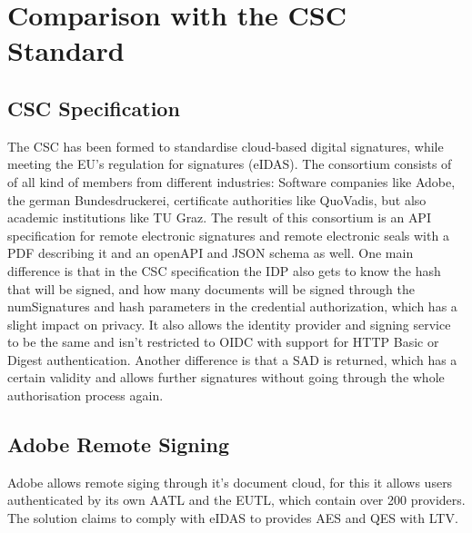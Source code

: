 \chapter{Comparison with the CSC Standard}

\section{CSC Specification}

The \gls{CSC} has been formed to standardise cloud-based digital signatures, while meeting the \gls{EU}'s regulation for signatures (\gls{eIDAS}).
The consortium consists of of all kind of members from different industries: Software companies like Adobe, the german Bundesdruckerei, certificate authorities like QuoVadis, but also academic institutions like TU Graz.
The result of this consortium is an \gls{API} specification for remote electronic signatures and remote electronic seals with a PDF describing it and an openAPI and \gls{JSON} schema as well\cite{csc-spec}.
One main difference is that in the \gls{CSC} specification the \gls{IDP} also gets to know the hash that will be signed, and how many documents will be signed through the numSignatures and hash parameters in the credential authorization, which has a slight impact on privacy.
It also allows the identity provider and signing service to be the same and isn't restricted to \gls{OIDC} with support for \gls{HTTP} Basic or Digest authentication.
Another difference is that a \gls{SAD} is returned, which has a certain validity and allows further signatures without going through the whole authorisation process again.

\section{Adobe Remote Signing}
Adobe allows remote siging through it's document cloud, for this it allows users authenticated by its own \gls{AATL} and the \gls{EUTL}, which contain over 200 providers\cite{adobe-cloud-sign}.
The solution claims to comply with \gls{eIDAS} to provides \gls{AES} and \gls{QES} with \gls{LTV}.